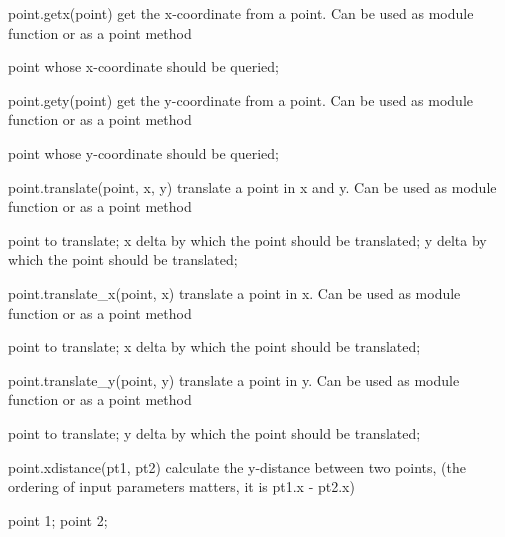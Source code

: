 \begin{APIfunc}{point.getx(point)}
    get the x-coordinate from a point. Can be used as module function or as a point method
    \begin{APIparameters}
            point whose x-coordinate should be queried;
    \end{APIparameters}
\end{APIfunc}
\begin{APIfunc}{point.gety(point)}
    get the y-coordinate from a point. Can be used as module function or as a point method
    \begin{APIparameters}
            point whose y-coordinate should be queried;
    \end{APIparameters}
\end{APIfunc}
\begin{APIfunc}{point.translate(point, x, y)}
    translate a point in x and y. Can be used as module function or as a point method
    \begin{APIparameters}
            point to translate;
            x delta by which the point should be translated;
            y delta by which the point should be translated;
    \end{APIparameters}
\end{APIfunc}
\begin{APIfunc}{point.translate\_x(point, x)}
    translate a point in x. Can be used as module function or as a point method
    \begin{APIparameters}
            point to translate;
            x delta by which the point should be translated;
    \end{APIparameters}
\end{APIfunc}
\begin{APIfunc}{point.translate\_y(point, y)}
    translate a point in y. Can be used as module function or as a point method
    \begin{APIparameters}
            point to translate;
            y delta by which the point should be translated;
    \end{APIparameters}
\end{APIfunc}
\begin{APIfunc}{point.xdistance(pt1, pt2)}
    calculate the y-distance between two points, (the ordering of input parameters matters, it is pt1.x - pt2.x)
    \begin{APIparameters}
            point 1;
            point 2;
    \end{APIparameters}
\end{APIfunc}
